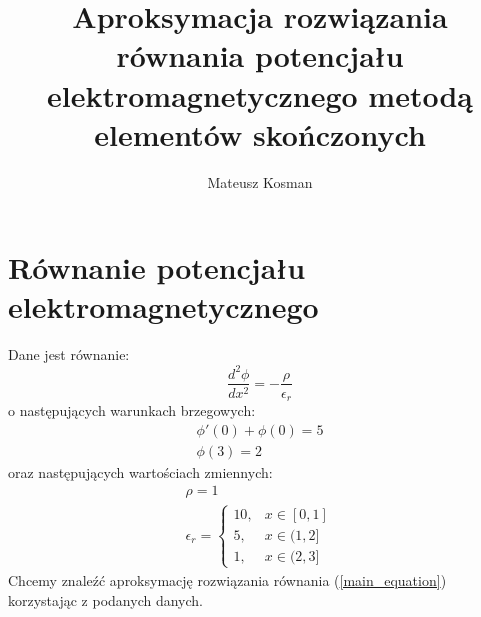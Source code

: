 \documentclass[a4paper,12pt]{article}
\begin{document}
    \title{Aproksymacja rozwiązania równania potencjału elektromagnetycznego metodą elementów skończonych}
    \author{Mateusz Kosman}
    \maketitle

    \allowdisplaybreaks

    \section{Równanie potencjału elektromagnetycznego}
    Dane jest równanie:
    \begin{equation}
        \frac{d^2\phi}{dx^2} = -\frac{\rho}{\epsilon_r} \label{main_equation}
    \end{equation}
    o następujących warunkach brzegowych:
    \begin{gather}
        \phi'(0)+\phi(0) = 5 \label{robin}\\
        \phi(3) = 2 \label{dirichlet}
    \end{gather}
    oraz następujących wartościach zmiennych:
    \begin{gather}
        \rho = 1 \label{rho_val}\\
        \epsilon_r =
        \begin{cases}
            10,& x \in [0,1] \\
            5,& x \in (1,2] \\
            1,& x \in (2,3]
        \end{cases} \label{epsilon_val}
    \end{gather}
    Chcemy znaleźć aproksymację rozwiązania równania (\ref{main_equation}) korzystając z podanych danych.
\end{document}
